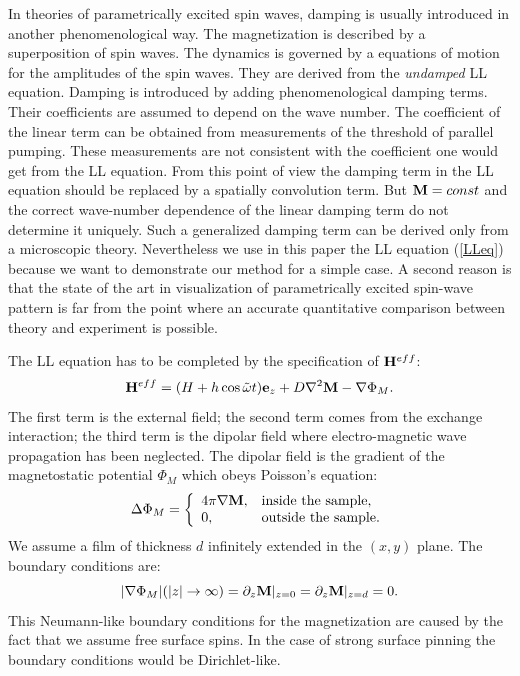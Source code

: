 In theories of parametrically excited spin waves, damping is usually
introduced in another phenomenological
way\cite{wig.94,zak.75,dam.63}. The magnetization is described by a
superposition of spin waves. The dynamics is governed by a equations
of motion for the amplitudes of the spin waves. They are derived from
the {\em undamped\/} LL equation. Damping is introduced by adding 
phenomenological damping terms. Their coefficients are assumed to 
depend on the wave number. The coefficient of the linear term can be
obtained from measurements of the threshold of parallel 
pumping\cite{dam.63}. These measurements are not consistent with the
coefficient one would get from the LL equation. From this point of
view the damping term in the LL equation should be replaced by a
spatially convolution term. But ${\bf M}=const$ and the correct
wave-number dependence of the linear damping term do not determine it
uniquely.  Such a generalized damping term can be derived only from a
microscopic theory\cite{gar.91,ple.93}. Nevertheless we use in this
paper the LL equation (\ref{LLeq}) because we want to demonstrate our
method for a simple case. A second reason is that the state of the
art in visualization of parametrically excited spin-wave pattern is
far from the point where an accurate quantitative comparison between
theory and experiment is possible.  

The LL equation has to be completed by the specification of 
${\bf H}^{eff}$:
\begin{equation}
  {\bf H}^{eff}=(H+h\cos\tilde{\omega}t){\bf e}_z+D\nabla^2{\bf M}
      -\nabla\Phi_M.
  \label{heff}
\end{equation}
The first term is the external field; the second term comes from the
exchange interaction; the third term is the dipolar field where 
electro-magnetic wave propagation has been neglected. The dipolar
field is the gradient of the magnetostatic potential $\Phi_M$ which
obeys Poisson's equation:
\begin{equation}
  \Delta\Phi_M = \left\{\begin{array}{ll}4\pi\nabla{\bf M},&
   \mbox{inside the sample,}\\0,&\mbox{outside the sample.}
   \end{array}\right.
  \label{Poi}
\end{equation}
We assume a film of thickness $d$ infinitely extended in the $(x,y)$
plane. The boundary conditions are:
\begin{equation}
  |\nabla\Phi_M|(|z|\to\infty)=\partial_z{\bf M}|_{z=0}=
   \partial_z{\bf M}|_{z=d}=0.
  \label{bc}
\end{equation}
This Neumann-like boundary conditions for the magnetization are
caused by the fact that we assume free surface spins. In the case of
strong surface pinning the boundary conditions would be
Dirichlet-like. 

